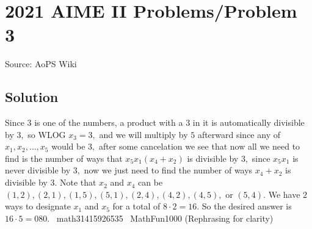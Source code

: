 \documentclass[12pt]{article}
\begin{document}
\section*{{2021 AIME II Problems/Problem 3}}
Source: AoPS Wiki

\subsection*{Solution}
Since $3$ is one of the numbers, a product with a $3$ in it is automatically divisible by $3,$ so WLOG $x_3=3,$ and we will multiply by $5$ afterward since any of $x_1, x_2, \ldots, x_5$ would be $3,$ after some cancelation we see that now all we need to find is the number of ways that $x_5x_1(x_4+x_2)$ is divisible by $3,$ since $x_5x_1$ is never divisible by $3,$ now we just need to find the number of ways $x_4+x_2$ is divisible by $3.$ Note that $x_2$ and $x_4$ can be $(1, 2), (2, 1), (1, 5), (5, 1), (2, 4), (4, 2), (4, 5),$ or $(5, 4).$ We have $2$ ways to designate $x_1$ and $x_5$ for a total of $8 \cdot 2 = 16.$ So the desired answer is $16 \cdot 5=\boxed{080}.$ ~math31415926535 ~MathFun1000 (Rephrasing for clarity)
\end{document}
